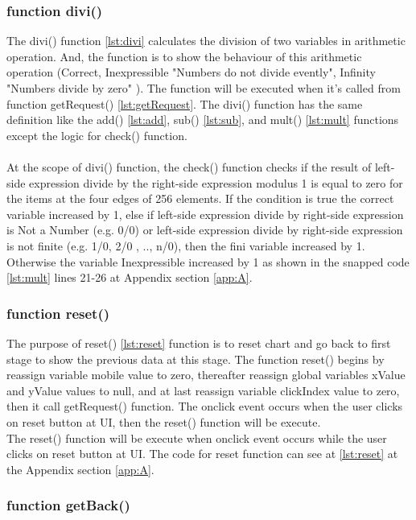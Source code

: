 \documentclass[11pt]{article}
\begin{document}
\subsubsection{function divi()}
The divi() function \ref{lst:divi} calculates the division of two variables in arithmetic operation. And, the function is to show the behaviour of this arithmetic operation (Correct, Inexpressible "Numbers do not divide evently", Infinity "Numbers divide by zero" ). The function will be executed when it's called from function getRequest() \ref{lst:getRequest}. The divi() function has the same definition like the add() \ref{lst:add}, sub() \ref{lst:sub}, and mult() \ref{lst:mult} functions except the logic for check() function.\\
\\At the scope of divi() function, the check() function checks if the result of left-side expression divide by the right-side expression modulus 1 is equal to zero for the items at the four edges of 256 elements. If the condition is true the correct variable increased by 1, else if left-side  expression divide by right-side expression is Not a Number (e.g. 0/0) or left-side expression divide by right-side expression is not finite (e.g. 1/0, 2/0 , .., n/0), then the fini variable increased by 1. Otherwise the variable Inexpressible increased by 1 as shown in the snapped code \ref{lst:mult} lines 21-26 at Appendix section \ref{app:A}.\\

\subsubsection{function reset()}
The purpose of reset() \ref{lst:reset} function is to reset chart and go back to first stage to show the previous data at this stage. The function reset() begins by reassign variable mobile value to zero, thereafter reassign global variables xValue and yValue values to null, and at last reassign variable clickIndex value to zero, then it call getRequest() function. The onclick event occurs when the user clicks on reset button at UI, then 
the reset() function will be execute.\\
The reset() function will be execute when onclick event occurs while the user clicks on reset button at UI. The code for reset function can see at \ref{lst:reset} at the Appendix section \ref{app:A}.

\subsubsection{function getBack()}
\end{document}

